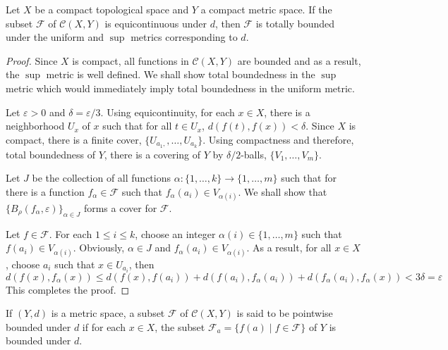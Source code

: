 \begin{lemma}
    Let $X$ be a compact topological space and $Y$ a compact metric space. If the subset $\mathcal F$ of $\mathcal C(X,Y)$ is equicontinuous under $d$, then $\mathcal F$ is totally bounded under the uniform and $\sup$ metrics corresponding to $d$.
\end{lemma}
\begin{proof}
    Since $X$ is compact, all functions in $\mathcal C(X,Y)$ are bounded and as a result, the $\sup$ metric is well defined. We shall show total boundedness in the $\sup$ metric which would immediately imply total boundedness in the uniform metric. 

    Let $\varepsilon > 0$ and $\delta = \varepsilon/3$. Using equicontinuity, for each $x\in X$, there is a neighborhood $U_x$ of $x$ such that for all $t\in U_x$, $d(f(t), f(x)) < \delta$. Since $X$ is compact, there is a finite cover, $\{U_{a_1,},\ldots,U_{a_k}\}$. Using compactness and therefore, total boundedness of $Y$, there is a covering of $Y$ by $\delta/2$-balls, $\{V_1,\ldots,V_m\}$.

    Let $J$ be the collection of all functions $\alpha:\{1,\ldots,k\}\to\{1,\ldots,m\}$ such that for there is a function $f_\alpha\in\mathcal F$ such that $f_\alpha(a_i)\in V_{\alpha(i)}$. We shall show that $\{B_\rho(f_\alpha,\varepsilon)\}_{\alpha\in J}$ forms a cover for $\mathcal F$.

    Let $f\in\mathcal F$. For each $1\le i\le k$, choose an integer $\alpha(i)\in \{1,\ldots,m\}$ such that $f(a_i)\in V_{\alpha(i)}$. Obviously, $\alpha\in J$ and $f_\alpha(a_i)\in V_{\alpha(i)}$. As a result, for all $x\in X$, choose $a_i$ such that $x\in U_{a_i}$, then 
    \begin{equation*}
        d(f(x), f_\alpha(x))\le d(f(x), f(a_i)) + d(f(a_i), f_\alpha(a_i)) + d(f_\alpha(a_i), f_\alpha(x)) < 3\delta = \varepsilon
    \end{equation*}
    This completes the proof.
\end{proof}

\begin{definition}
    If $(Y,d)$ is a metric space, a subset $\mathcal F$ of $\mathcal C(X,Y)$ is said to be pointwise bounded under $d$ if for each $x\in X$, the subset $\mathcal F_a = \{f(a)\mid f\in\mathcal F\}$ of $Y$ is bounded under $d$.
\end{definition}

